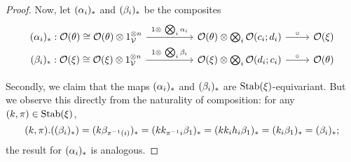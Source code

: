 \documentclass[a4paper,10pt
,draft
]{article}%
\renewcommand{\1}{\ensuremath{\mathbb{id}}}
\begin{document}
\begin{proof}
      Now, let $(\alpha_i)_{\**}$ and $(\beta_i)_{\**}$ be the composites
      \begin{equation}
            \begin{tikzcd}[row sep = tiny]
                  (\alpha_i)_{\**} : 
                  \O(\theta)
                  \cong
                  \O(\theta) \otimes 1_\V^{\otimes n} \arrow[rr, "1 \otimes\ \bigotimes_i \alpha_i"]
                  &&
                  \O(\theta) \otimes \bigotimes_i \O(c_i;d_i) \arrow[r,"\circ"]
                  &
                  \O(\ksi)
                  \\
                  (\beta_i)_{\**} :
                  \O(\ksi)
                  \cong
                  \O(\ksi) \otimes 1_\V^{\otimes n} \arrow[rr, "1 \otimes\ \bigotimes_i \beta_i"]
                  &&
                  \O(\ksi) \otimes \bigotimes_i \O(d_i;c_i) \arrow[r,"\circ"]
                  &
                  \O(\theta)
            \end{tikzcd}
      \end{equation}

      Secondly, we claim that the maps $(\alpha_i)_{\**}$ and $(\beta_i)_{\**}$ are $\mathrm{Stab}(\xi)$-equivariant.
      But we observe this directly from the naturality of composition: for any $(k,\pi) \in \mathrm{Stab}(\xi)$,
      \begin{equation}
            (k, \pi) . ((\beta_i)_{\**})
            =
            (k \beta_{\pi^{-1}(i)})_{\**}
            =
            (k k_{\pi^{-1}i} \beta_1)_{\**}
            =
            (k k_i h_i \beta_1)_{\**}
            =
            (k_i \beta_1)_{\**}
            =
            (\beta_i)_{\**};
      \end{equation}
      the result for $(\alpha_i)_{\**}$ is analogous.
      

\end{proof}
\end{document}
